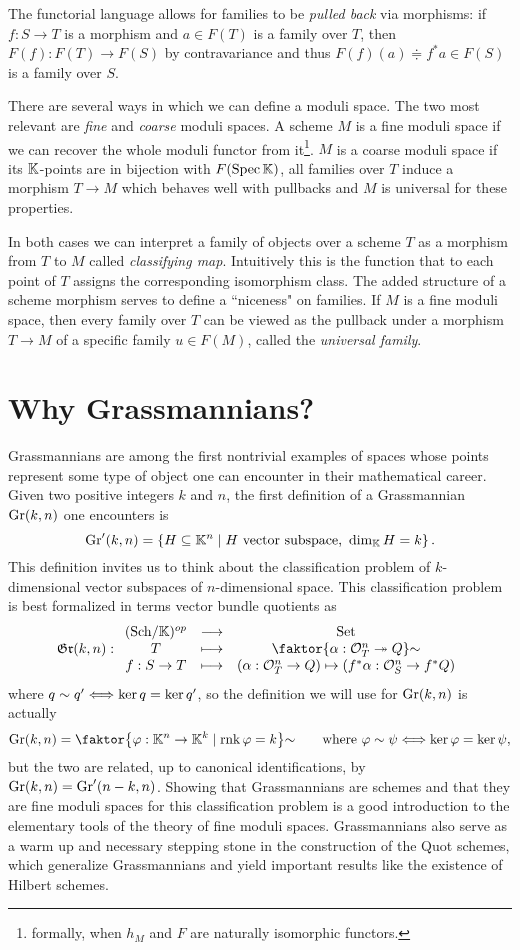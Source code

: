 The functorial language allows for families to be \textit{pulled back} via morphisms: if $f:S\to T$ is a morphism and $a\in F(T)$ is a family over $T$, then $F(f):F(T)\to F(S)$ by contravariance and thus $F(f)(a)\doteqdot f^\ast a\in F(S)$ is a family over $S$.
\medskip

There are several ways in which we can define a moduli space. The two most relevant are \textit{fine} and \textit{coarse} moduli spaces. A scheme $M$ is a fine moduli space if we can recover the whole moduli functor from it\footnote{formally, when $h_M$ and $F$ are naturally isomorphic functors.}. $M$ is a coarse moduli space if its $\mathbb{K}$-points are in bijection with $F(\mathrm{Spec}\, \mathbb{K})$, all families over $T$ induce a morphism $T\to M$ which behaves well with pullbacks and $M$ is universal for these properties.

In both cases we can interpret a family of objects over a scheme $T$ as a morphism from $T$ to $M$ called \textit{classifying map}.  Intuitively this is the function that to each point of $T$ assigns the corresponding isomorphism class. The added structure of a scheme morphism serves to define a ``niceness" on families. If $M$ is a fine moduli space, then every family over $T$ can be viewed as the pullback under a morphism $T\to M$ of a specific family $u\in F(M)$, called the \textit{universal family}.

\section*{Why Grassmannians?}
Grassmannians are among the first nontrivial examples of spaces whose points represent some type of object one can encounter in their mathematical career. Given two positive integers $k$ and $n$, the first definition of a Grassmannian $\mathrm{Gr}(k,n)$ one encounters is
\[\mathrm{Gr}'(k,n)=\left\{{H\subseteq\mathbb{K}^n\mid \text{$H$ vector subspace, }\dim_{\mathbb{K}} H=k}\right\}.\]
This definition invites us to think about the classification problem of $k$-dimensional vector subspaces of $n$-dimensional space. This classification problem is best formalized in terms vector bundle quotients as
\[\gr(k,n):\functorDef{(\Sch\K)\op}{\Set}{T}{\quot{\cpa{\al:\Oc_T^n\onto Q}}\sim}{f:S\to T}{(\al:\Oc_T^n\to Q)\mapsto (f^\ast\al:\Oc_S^n\to f^\ast Q)}\]
where $q\sim q'\Longleftrightarrow \ker q=\ker q'$, so the definition we will use for $\mathrm{Gr}(k,n)$ is actually
\[\Gr(k,n)=\quot{\cpa{\vp:\K^n\to \K^k\mid \rnk \vp=k}}\sim\qquad \text{where }\vp\sim \psi\coimplies \ker\vp=\ker\psi,\]
but the two are related, up to canonical identifications, by $\mathrm{Gr}(k,n)=\mathrm{Gr}'(n-k,n)$.
Showing that Grassmannians are schemes and that they are fine moduli spaces for this classification problem is a good introduction to the elementary tools of the theory of fine moduli spaces. Grassmannians also serve as a warm up and necessary stepping stone in the construction of the Quot schemes, which generalize Grassmannians and yield important results like the existence of Hilbert schemes.